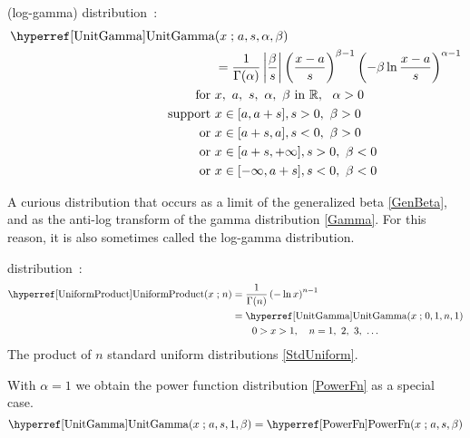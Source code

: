 


\label{sec:UnitGamma}
 (log-gamma) distribution~\cite{Olshen1938,Consul1971,Grassia1977,Gupta2004}:
\begin{align}
\label{UnitGamma}
\opr{UnitGamma}&(x\given a, s,\alpha,\beta) \\ \notag &= \frac{1}{\Gamma(\alpha)} \left|\frac{\beta}{ s}\right|
\left(\frac{x-a}{s}\right)^{\beta-1} \left(-\beta \ln   \frac{x-a}{s} \right)^{\alpha-1}  \checked
\notag
\\ \text{for }& x,\ a,\ s,\ \alpha,\ \beta \text{ in } \mathbb{R},\ \ \alpha >0
\notag
 \\ \text{ support } & x \in [a,a+s], s>0,\ \beta>0 \notag \\ \text{ or } &  x\in[a+s,a], s<0,\ \beta>0 
 \notag 
 \\  \notag  \text{ or } &  x\in[a+s,+\infty], s>0,\ \beta<0 
 \\  \notag  \text{ or } &  x\in[-\infty,a+s], s<0,\ \beta<0 
\end{align}

A curious distribution that occurs as a limit of the generalized beta \eqref{GenBeta}, and as the anti-log transform of the gamma distribution \eqref{Gamma}. For this reason, it is also sometimes called the log-gamma distribution.





 distribution~\cite{Springer1979a}:
\begin{align}
\label{UniformProduct}
\opr{UniformProduct}(x\given n) &=  \frac{1}{\Gamma(n)} \left( -\ln x \right)^{n-1} 	\checked
 \\ \notag & = \opr{UnitGamma}(x\given 0, 1,n,1)							\checked
 \\ \notag & \qquad 0>x>1, \quad n = 1,\ 2,\ 3,\ \ldots							\checked
\end{align}
The product of $n$ standard uniform distributions \eqref{StdUniform}.



With  $\alpha=1$ we obtain the power function distribution \eqref{PowerFn} as a special case.
\[
\opr{UnitGamma}(x\given a, s,1,\beta) = \opr{PowerFn}(x\given a,s,\beta) \checked
\]

